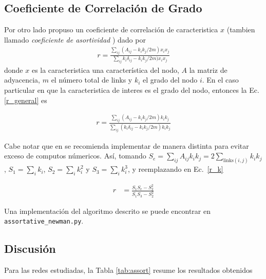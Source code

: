 \subsection{Coeficiente de Correlaci\'on de Grado}
Por otro lado \citet{newman,newman2003} propuso un coeficiente de correlaci\'on de caracteristica $x$ (tambien llamado 
\textit{coeficiente de asortividad} ) dado por
\begin{align}
    r = \frac{\sum_{ij} \left( A_{ij} - k_i k_j/2m\right) x_i x_j}{\sum_{ij}k_i \delta_{ij} - k_i k_j/2m)x_i x_j}
    \label{r_general}
\end{align}
donde $x$ es la caracteristica una caracter\'istica del nodo, $A$ la matriz de adyacencia, $m$ el n\'umero total de links y $k_i$ el grado del nodo $i$. En el caso particular en que la caracteristica de interes es el grado del nodo, 
entonces la Ec. \ref{r_general} es

\begin{align}
    r = \frac{\sum_{ij} \left( A_{ij} - k_i k_j/2m\right) k_i k_j}{\sum_{ij}(k_i \delta_{ij} - k_i k_j/2m)k_i k_j}
    \label{r_k}
\end{align}

Cabe notar que en \citet{newman} se recomienda implementar de manera distinta para evitar exceso de computos n\'umericos. As\'i, 
tomando $  S_e = \sum_{ij} A_{ij} k_i k_j = 2\sum_{\text{links}(i,j)} k_i k_j $, 
$ S_1 = \sum_i k_i $, $ S_2 = \sum_i k_i^2 $ y $ S_3 = \sum_i k_i^3 $, y reemplazando en Ec.~\ref{r_k}

\begin{align}
    r &= \frac{S_1S_e - S_2^2}{S_1S_3 - S_2^2}
\end{align}

Una implementaci\'on del algoritmo descrito se puede encontrar en \linebreak \texttt{assortative\_newman.py}. 



\subsection{Discusi\'on}

Para las redes estudiadas, la Tabla \ref{tab:assort} resume los resultados obtenidos 

